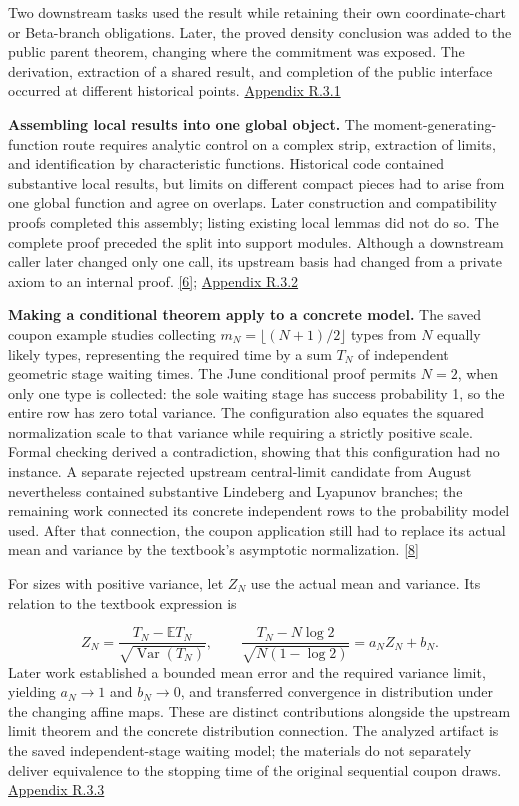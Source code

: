 Two downstream tasks used the result while retaining their own coordinate-chart or Beta-branch obligations. Later, the proved density conclusion was added to the public parent theorem, changing where the commitment was exposed. The derivation, extraction of a shared result, and completion of the public interface occurred at different historical points. \href{en-appendix.pdf\#r3-1}{Appendix R.3.1}

\textbf{Assembling local results into one global object.} The moment-generating-function route requires analytic control on a complex strip, extraction of limits, and identification by characteristic functions. Historical code contained substantive local results, but limits on different compact pieces had to arise from one global function and agree on overlaps. Later construction and compatibility proofs completed this assembly; listing existing local lemmas did not do so. The complete proof preceded the split into support modules. Although a downstream caller later changed only one call, its upstream basis had changed from a private axiom to an internal proof. \hyperlink{ref-6}{\mbox{[6]}}; \href{en-appendix.pdf\#r3-2}{Appendix R.3.2}

\textbf{Making a conditional theorem apply to a concrete model.} The saved coupon example studies collecting $m_N=\lfloor(N+1)/2\rfloor$ types from $N$ equally likely types, representing the required time by a sum $T_N$ of independent geometric stage waiting times. The June conditional proof permits $N=2$, when only one type is collected: the sole waiting stage has success probability 1, so the entire row has zero total variance. The configuration also equates the squared normalization scale to that variance while requiring a strictly positive scale. Formal checking derived a contradiction, showing that this configuration had no instance. A separate rejected upstream central-limit candidate from August nevertheless contained substantive Lindeberg and Lyapunov branches; the remaining work connected its concrete independent rows to the probability model used. After that connection, the coupon application still had to replace its actual mean and variance by the textbook's asymptotic normalization. \hyperlink{ref-8}{\mbox{[8]}}

For sizes with positive variance, let $Z_N$ use the actual mean and variance. Its relation to the textbook expression is

\[
Z_N=\frac{T_N-\mathbb E T_N}{\sqrt{\operatorname{Var}(T_N)}},\qquad
\frac{T_N-N\log2}{\sqrt{N(1-\log2)}}=a_NZ_N+b_N.
\]
Later work established a bounded mean error and the required variance limit, yielding $a_N\to1$ and $b_N\to0$, and transferred convergence in distribution under the changing affine maps. These are distinct contributions alongside the upstream limit theorem and the concrete distribution connection. The analyzed artifact is the saved independent-stage waiting model; the materials do not separately deliver equivalence to the stopping time of the original sequential coupon draws. \href{en-appendix.pdf\#r3-3}{Appendix R.3.3}

